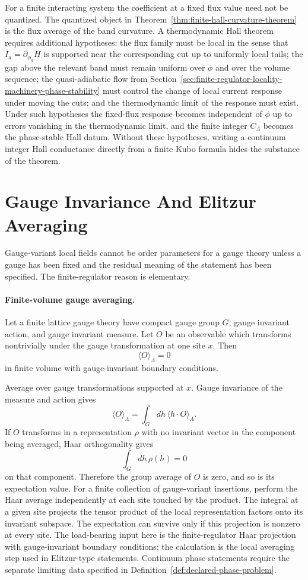 For a finite interacting system the coefficient at a fixed flux value need
not be quantized.  The quantized object in
Theorem~\ref{thm:finite-hall-curvature-theorem} is the flux average of the
band curvature.  A thermodynamic Hall theorem requires additional hypotheses:
the flux family must be local in the sense that \(I_a=\partial_{\phi_a}H\)
is supported near the corresponding cut up to uniformly local tails; the gap
above the relevant band must remain uniform over \(\phi\) and over the
volume sequence; the quasi-adiabatic flow from
Section~\ref{sec:finite-regulator-locality-machinery-phase-stability} must
control the change of local current response under moving the cuts; and the
thermodynamic limit of the response must exist.  Under such hypotheses the
fixed-flux response becomes independent of \(\phi\) up to errors vanishing in
the thermodynamic limit, and the finite integer \(C_\Lambda\) becomes the
phase-stable Hall datum.  Without these hypotheses, writing a continuum
integer Hall conductance directly from a finite Kubo formula hides the
substance of the theorem.

\section{Gauge Invariance And Elitzur Averaging}
\label{sec:gauge-invariance-elitzur-averaging}

Gauge-variant local fields cannot be order parameters for a gauge theory
unless a gauge has been fixed and the residual meaning of the statement has
been specified.  The finite-regulator reason is elementary.

\paragraph{Finite-volume gauge averaging.}
Let a finite lattice gauge theory have compact gauge group \(G\), gauge
invariant action, and gauge invariant measure.  Let \(O\) be an observable
which transforms nontrivially under the gauge transformation at one site
\(x\).  Then
\[
  \langle O\rangle_\Lambda=0
\]
in finite volume with gauge-invariant boundary conditions.

Average over gauge transformations supported at \(x\).  Gauge invariance of
the measure and action gives
\[
  \langle O\rangle_\Lambda
  =
  \int_G dh\,\langle h\cdot O\rangle_\Lambda .
\]
If \(O\) transforms in a representation \(\rho\) with no invariant vector in
the component being averaged, Haar orthogonality gives
\[
  \int_G dh\,\rho(h)=0
\]
on that component.  Therefore the group average of \(O\) is zero, and so is
its expectation value.  For a finite collection of gauge-variant insertions,
perform the Haar average independently at each site touched by the product.
The integral at a given site projects the tensor product of the local
representation factors onto its invariant subspace.  The expectation can
survive only if this projection is nonzero at every site.
The load-bearing input here is the finite-regulator Haar projection with
gauge-invariant boundary conditions; the calculation is the local averaging
step used in Elitzur-type statements.  Continuum phase statements require the
separate limiting data specified in
Definition~\ref{def:declared-phase-problem}.

